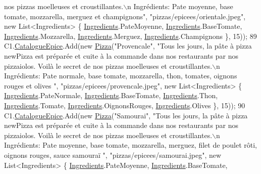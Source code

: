 \begin{DoxyCode}
{       nos pizzas moelleuses et croustillantes.\(\backslash\)n Ingrédients: Pate moyenne, base tomate, mozzarella, merguez et
       champignons"}, \textcolor{stringliteral}{"pizzas/epicees/orientale.jpeg"}, \textcolor{keyword}{new} List<Ingredients> \{ \hyperlink{namespaceModele_a001a8e89e56a724f24a249ba98080d41}{Ingredients}.PateMoyenne, 
      \hyperlink{namespaceModele_a001a8e89e56a724f24a249ba98080d41}{Ingredients}.BaseTomate, \hyperlink{namespaceModele_a001a8e89e56a724f24a249ba98080d41}{Ingredients}.Mozzarella, 
      \hyperlink{namespaceModele_a001a8e89e56a724f24a249ba98080d41}{Ingredients}.Merguez, \hyperlink{namespaceModele_a001a8e89e56a724f24a249ba98080d41}{Ingredients}.Champignons \}, 15));
89             C1.\hyperlink{classModele_1_1Catalogue_a633610212f42551a5755212e21bedbca}{CatalogueEpice}.Add(\textcolor{keyword}{new} \hyperlink{classModele_1_1Pizza}{Pizza}(\textcolor{stringliteral}{"Provencale"}, \textcolor{stringliteral}{"Tous les jours, la pâte à
       pizza newPizza est préparée et cuite à la commande dans nos restaurants par nos pizzaiolos. Voilà le secret de
       nos pizzas moelleuses et croustillantes.\(\backslash\)n Ingrédients: Pate normale, base tomate, mozzarella, thon,
       tomates, oignons rouges et olives "}, \textcolor{stringliteral}{"pizzas/epicees/provencale.jpeg"}, \textcolor{keyword}{new} List<Ingredients> \{ 
      \hyperlink{namespaceModele_a001a8e89e56a724f24a249ba98080d41}{Ingredients}.PateNormale, \hyperlink{namespaceModele_a001a8e89e56a724f24a249ba98080d41}{Ingredients}.BaseTomate, 
      \hyperlink{namespaceModele_a001a8e89e56a724f24a249ba98080d41}{Ingredients}.Thon, \hyperlink{namespaceModele_a001a8e89e56a724f24a249ba98080d41}{Ingredients}.Tomate, \hyperlink{namespaceModele_a001a8e89e56a724f24a249ba98080d41}{Ingredients}.OignonsRouges, 
      \hyperlink{namespaceModele_a001a8e89e56a724f24a249ba98080d41}{Ingredients}.Olives \}, 15));
90             C1.\hyperlink{classModele_1_1Catalogue_a633610212f42551a5755212e21bedbca}{CatalogueEpice}.Add(\textcolor{keyword}{new} \hyperlink{classModele_1_1Pizza}{Pizza}(\textcolor{stringliteral}{"Samourai"}, \textcolor{stringliteral}{"Tous les jours, la pâte à pizza
       newPizza est préparée et cuite à la commande dans nos restaurants par nos pizzaiolos. Voilà le secret de
       nos pizzas moelleuses et croustillantes.\(\backslash\)n Ingrédients: Pate moyenne, base tomate, mozzarella, merguez, filet
       de poulet rôti, oignons rouges, sauce samouraï "}, \textcolor{stringliteral}{"pizzas/epicees/samourai.jpeg"}, \textcolor{keyword}{new} List<Ingredients> \{ 
      \hyperlink{namespaceModele_a001a8e89e56a724f24a249ba98080d41}{Ingredients}.PateMoyenne, \hyperlink{namespaceModele_a001a8e89e56a724f24a249ba98080d41}{Ingredients}.BaseTomate, 

\end{DoxyCode}
